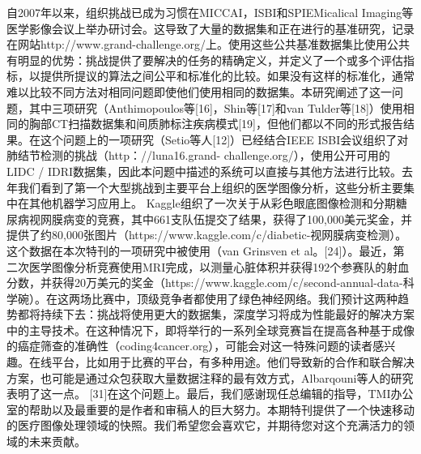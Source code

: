 自2007年以来，组织挑战已成为习惯在MICCAI，ISBI和SPIEMicalical Imaging等医学影像会议上举办研讨会。这导致了大量的数据集和正在进行的基准研究，记录在网站http://www.grand-challenge.org/上。使用这些公共基准数据集比使用公共有明显的优势：挑战提供了要解决的任务的精确定义，并定义了一个或多个评估指标，以提供所提议的算法之间公平和标准化的比较。如果没有这样的标准化，通常难以比较不同方法对相同问题即使他们使用相同的数据集。本研究阐述了这一问题，其中三项研究（Anthimopoulos等[16]，Shin等[17]和van Tulder等[18]）使用相同的胸部CT扫描数据集和间质肺标注疾病模式[19]，但他们都以不同的形式报告结果。在这个问题上的一项研究（Setio等人[12]）已经结合IEEE ISBI会议组织了对肺结节检测的挑战（http：//luna16.grand- challenge.org/），使用公开可用的LIDC / IDRI数据集，因此本问题中描述的系统可以直接与其他方法进行比较。去年我们看到了第一个大型挑战到主要平台上组织的医学图像分析，这些分析主要集中在其他机器学习应用上。 Kaggle组织了一次关于从彩色眼底图像检测和分期糖尿病视网膜病变的竞赛，其中661支队伍提交了结果，获得了100,000美元奖金，并提供了约80,000张图片（https://www.kaggle.com/c/diabetic-视网膜病变检测）。这个数据在本次特刊的一项研究中被使用（van Grinsven et al。[24]）。最近，第二次医学图像分析竞赛使用MRI完成，以测量心脏体积并获得192个参赛队的射血分数，并获得20万美元的奖金（https://www.kaggle.com/c/second-annual-data-科学碗）。在这两场比赛中，顶级竞争者都使用了绿色神经网络。我们预计这两种趋势都将持续下去：挑战将使用更大的数据集，深度学习将成为性能最好的解决方案中的主导技术。在这种情况下，即将举行的一系列全球竞赛旨在提高各种基于成像的癌症筛查的准确性（coding4cancer.org），可能会对这一特殊问题的读者感兴趣。在线平台，比如用于比赛的平台，有多种用途。他们导致新的合作和联合解决方案，也可能是通过众包获取大量数据注释的最有效方式，Albarqouni等人的研究表明了这一点。 [31]在这个问题上。最后，我们感谢现任总编辑的指导，TMI办公室的帮助以及最重要的是作者和审稿人的巨大努力。本期特刊提供了一个快速移动的医疗图像处理领域的快照。我们希望您会喜欢它，并期待您对这个充满活力的领域的未来贡献。